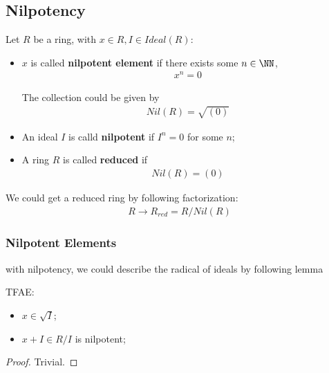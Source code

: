 \documentclass[Total.tex]{subfiles}
\begin{document}
				\subsection{Nilpotency}
					\begin{Def} Let $R$ be a ring, with $x\in R,I\in Ideal(R)$:
						\begin{itemize}
							\item $x$ is called \textbf{nilpotent element} if there exists some $n\in \NN$,
							\begin{gather*}
								x^n=0
							\end{gather*}
							
							The collection could be given by
							\begin{gather*}
								Nil(R)=\sqrt{(0)}
							\end{gather*}
							\item An ideal $I$ is calld \textbf{nilpotent} if $I^n=0$ for some $n$;
							
							\item A ring $R$ is called \textbf{reduced} if
							\begin{gather*}
								Nil(R)=(0)
							\end{gather*}
						\end{itemize}
						
						
						We could get a reduced ring by following factorization:
						\begin{gather*}
							R\rightarrow R_{red}=R/Nil(R)
						\end{gather*}
					\end{Def}
					
					
					
					\subsubsection{Nilpotent Elements}
					
					with nilpotency, we could describe the radical of ideals by following lemma
					\begin{proposition}
						TFAE:
						\begin{itemize}
							\item $x\in \sqrt{I} $;
							\item $x+I\in R/I$ is nilpotent;
						\end{itemize}
					\end{proposition}
					\begin{proof}
						Trivial. 
					\end{proof}
					
\end{document}
